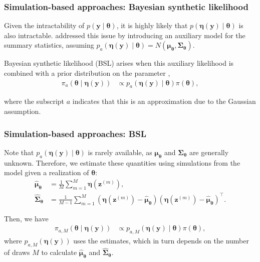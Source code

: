 \documentclass[12pt, compress]{beamer}
\begin{document}
\begin{frame}
	\frametitle{Simulation-based approaches: Bayesian synthetic likelihood}
Given the intractability of $p(\boldsymbol{y} \mid \boldsymbol{\theta})$, it is highly likely that $p(\boldsymbol{\eta}(\boldsymbol{y}) \mid \boldsymbol{\theta})$ is also intractable. \cite{wood2010statistical} addressed this issue by introducing an auxiliary model for the summary statistics, assuming $p_a(\boldsymbol{\eta}(\boldsymbol{y})\mid \boldsymbol{\theta}) = N(\boldsymbol{\mu}_{\boldsymbol{\theta}}, \boldsymbol{\Sigma}_{\boldsymbol{\theta}})$.

Bayesian synthetic likelihood (BSL) arises when this auxiliary likelihood is combined with a prior distribution on the parameter \citep{drovandi2015bayesian,price2018bayesian},
\begin{align*} 
	\pi_{a}(\boldsymbol{\theta} \mid \boldsymbol{\eta}(\boldsymbol{y})) &\propto p_{a}(\boldsymbol{\eta}(\boldsymbol{y})\mid \boldsymbol{\theta}) \pi(\boldsymbol{\theta}), 
\end{align*}

where the subscript \( a \) indicates that this is an approximation due to the Gaussian assumption.
\end{frame}

\begin{frame}
	\frametitle{Simulation-based approaches: BSL}
Note that \( p_a(\boldsymbol{\eta}(\boldsymbol{y})\mid \boldsymbol{\theta}) \) is rarely available, as \( \boldsymbol{\mu}_{\boldsymbol{\theta}} \) and \( \boldsymbol{\Sigma}_{\boldsymbol{\theta}} \) are generally unknown. Therefore, we estimate these quantities using simulations from the model given a realization of $\boldsymbol{\theta}$:
\begin{align*} 
	\widehat{\boldsymbol{\mu}}_{\boldsymbol{\theta}} &= \frac{1}{M} \sum_{m=1}^{M} \boldsymbol{\eta}(\boldsymbol{z}^{(m)}),\\
	\widehat{\boldsymbol{\Sigma}}_{\boldsymbol{\theta}} &= \frac{1}{M-1} \sum_{m=1}^{M} (\boldsymbol{\eta}(\boldsymbol{z}^{(m)}) - \widehat{\boldsymbol{\mu}}_{\boldsymbol{\theta}})(\boldsymbol{\eta}(\boldsymbol{z}^{(m)}) - \widehat{\boldsymbol{\mu}}_{\boldsymbol{\theta}})^{\top}. 
\end{align*}

Then, we have 
\begin{align*} 
	\pi_{a,M}(\boldsymbol{\theta} \mid \boldsymbol{\eta}(\boldsymbol{y})) &\propto p_{a,M}(\boldsymbol{\eta}(\boldsymbol{y})\mid \boldsymbol{\theta}) \pi(\boldsymbol{\theta}), 
\end{align*}
where $p_{a,M}(\boldsymbol{\eta}(\boldsymbol{y}))$ uses the estimates, which in turn depends on the number of draws $M$ to calculate $\widehat{\boldsymbol{\mu}}_{\boldsymbol{\theta}}$ and $\widehat{\boldsymbol{\Sigma}}_{\boldsymbol{\theta}}$.
\end{frame}
\end{document}
